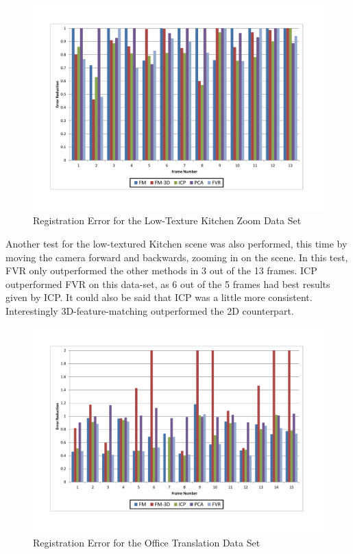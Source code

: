\begin{figure}[t]
\centering
\includegraphics[width=6.0in]{images/results/Kitchen_Little_Texture_Zoom}
\caption{Registration Error for the Low-Texture Kitchen Zoom Data Set}
\label{fig:PET7}
\end{figure}

Another test for the low-textured Kitchen scene was also performed, this time by moving the camera forward and backwards, zooming in on the scene. In this test, FVR only outperformed the other methods in 3 out of the 13 frames. ICP outperformed FVR on this data-set, as 6 out of the 5 frames had best results given by ICP. It could also be said that ICP was a little more consistent. Interestingly 3D-feature-matching outperformed the 2D counterpart.

\begin{figure}[t]
\centering
\includegraphics[width=6.0in]{images/results/Office_TexturedItems_Translation}
\caption{Registration Error for the Office Translation Data Set}
\label{fig:PET8}
\end{figure}

